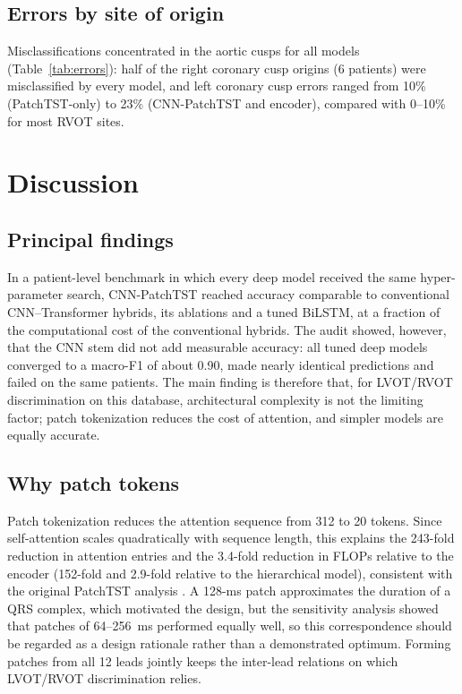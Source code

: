 \documentclass[preprint,12pt]{elsarticle}
\begin{document}
\subsection{Errors by site of origin}
Misclassifications concentrated in the aortic cusps for all models (Table~\ref{tab:errors}): half of the right coronary cusp origins (6 patients) were misclassified by every model, and left coronary cusp errors ranged from 10\% (PatchTST-only) to 23\% (CNN-PatchTST and encoder), compared with 0--10\% for most RVOT sites.

\begin{table}[!htbp]
\centering
\caption{Misclassification rate by site of origin (pooled out-of-fold predictions averaged over three seeds; development cohort).}
\label{tab:errors}
\footnotesize

\end{table}

\section{Discussion}
\label{sec:discussion}

\subsection{Principal findings}
In a patient-level benchmark in which every deep model received the same hyper-parameter search, CNN-PatchTST reached accuracy comparable to conventional CNN--Transformer hybrids, its ablations and a tuned BiLSTM, at a fraction of the computational cost of the conventional hybrids. The audit showed, however, that the CNN stem did not add measurable accuracy: all tuned deep models converged to a macro-F1 of about 0.90, made nearly identical predictions and failed on the same patients. The main finding is therefore that, for LVOT/RVOT discrimination on this database, architectural complexity is not the limiting factor; patch tokenization reduces the cost of attention, and simpler models are equally accurate.

\subsection{Why patch tokens}
Patch tokenization reduces the attention sequence from 312 to 20 tokens. Since self-attention scales quadratically with sequence length, this explains the 243-fold reduction in attention entries and the 3.4-fold reduction in FLOPs relative to the encoder (152-fold and 2.9-fold relative to the hierarchical model), consistent with the original PatchTST analysis \cite{nie2023patchtst}. A 128-ms patch approximates the duration of a QRS complex, which motivated the design, but the sensitivity analysis showed that patches of 64--256~ms performed equally well, so this correspondence should be regarded as a design rationale rather than a demonstrated optimum. Forming patches from all 12 leads jointly keeps the inter-lead relations on which LVOT/RVOT discrimination relies.
\end{document}
